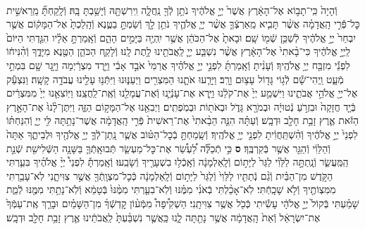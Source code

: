 \documentclass[twoside, openany, parskip=half, 11pt]{book}
\begin{document}
\begin{sometimes}
\begin{footnotesize}
\begin{multicols}{2}
\\
וְֿהָיָה֙ כִּֽי־תָב֣וֹא אֶל־הָאָ֔רֶץ אֲשֶׁר֙ יְיָ֣ אֱלֹהֶ֔יךָ נֹתֵ֥ן לְֿךָ֖ נַֽחֲלָ֑ה וִֽירִשְׁתָּ֖הּ וְֿיָשַׁ֥בְתָּ בָּֽהּ׃ וְֿלָֽקַחְתָּ֞ מֵֽרֵאשִׁ֣ית כׇּל־פְּֿֿרִ֣י הָֽאֲדָמָ֗ה אֲשֶׁ֨ר תָּבִ֧יא מֵֽאַרְצְֿךָ֛ אֲשֶׁ֨ר יְיָ֧ אֱלֹהֶ֛יךָ נֹתֵ֥ן לָ֖ךְ וְֿשַׂמְתָּ֣ בַטֶּ֑נֶא וְֿהָֽלַכְתָּ֙ אֶל־הַמָּק֔וֹם אֲשֶׁ֤ר יִבְחַר֙ יְיָ֣ אֱלֹהֶ֔יךָ לְֿשַׁכֵּ֥ן שְֿׁמ֖וֹ שָֽׁם׃ וּבָאתָ֙ אֶל־הַכֹּהֵ֔ן אֲשֶׁ֥ר יִֽהְיֶ֖ה בַּיָּמִ֣ים הָהֵ֑ם וְֿאָֽמַרְתָּ֣ אֵלָ֗יו הִגַּ֤דְתִּי הַיּוֹם֙ לַֽיְיָ֣ אֱלֹהֶ֔יךָ כִּי־בָ֨אתִי֙ אֶל־הָאָ֔רֶץ אֲשֶׁ֨ר נִשְׁבַּ֧ע יְיָ֛ לַֽאֲבֹתֵ֖ינוּ לָ֥תֶת לָֽנוּ׃
וְֿלָקַ֧ח הַכֹּהֵ֛ן הַטֶּ֖נֶא מִיָּדֶ֑ךָ וְֿהִ֨נִּיח֔וֹ לִפְנֵ֕י מִזְבַּ֖ח יְיָ֥ אֱלֹהֶֽיךָ׃ וְֿעָנִ֨יתָ וְֿאָֽמַרְתָּ֜ לִפְנֵ֣י יְיָ֣ אֱלֹהֶ֗יךָ אֲרַמִּי֙ אֹבֵ֣ד אָבִ֔י וַיֵּ֣רֶד מִצְרַ֔יְמָה וַיָּ֥גָר שָׁ֖ם בִּמְתֵ֣י מְֿעָ֑ט וַֽיְהִי־שָׁ֕ם לְֿג֥וֹי גָּד֖וֹל עָצ֥וּם וָרָֽב׃ וַיָּרֵ֧עוּ אֹתָ֛נוּ הַמִּצְרִ֖ים וַיְעַנּ֑וּנוּ וַיִּתְּֿנ֥וּ עָלֵ֖ינוּ עֲבֹדָ֥ה קָשָֽׁה׃ וַנִּצְעַ֕ק אֶל־יְיָ֖ אֱלֹהֵ֣י אֲבֹתֵ֑ינוּ וַיִּשְׁמַ֤ע יְיָ֙ אֶת־קֹלֵ֔נוּ וַיַּ֧רְא אֶת־עָנְֿיֵ֛נוּ וְֿאֶת־עֲמָלֵ֖נוּ וְֿאֶֽת־לַֽחֲצֵֽנוּ׃ וַיּֽוֹצִאֵ֤נוּ יְיָ֙ מִמִּצְרַ֔יִם בְּֿיָ֤ד חֲזָקָה֙ וּבִזְרֹ֣עַ נְֿטוּיָ֔ה וּבְמֹרָ֖א גָּדֹ֑ל וּבְאֹת֖וֹת וּבְמֹֽפְתִֽים׃ וַיְבִאֵ֖נוּ אֶל־הַמָּק֣וֹם הַזֶּ֑ה וַיִּתֶּן־לָ֨נוּ֙ אֶת־הָאָ֣רֶץ הַזֹּ֔את אֶ֛רֶץ זָבַ֥ת חָלָ֖ב וּדְבָֽשׁ׃ וְֿעַתָּ֗ה הִנֵּ֤ה הֵבֵ֨אתִי֙ אֶת־רֵאשִׁית֙ פְּֿרִ֣י הָֽאֲדָמָ֔ה אֲשֶׁר־נָתַ֥תָּה לִּ֖י יְיָ֑ וְֿהִנַּחְתּ֗וֹ לִפְנֵי֙ יְיָ֣ אֱלֹהֶ֔יךָ וְֿהִ֨שְׁתַּֽחֲוִ֔יתָ לִפְנֵ֖י יְיָ֥ אֱלֹהֶֽיךָ׃ וְֿשָֽׂמַחְתָּ֣ בְֿכׇל־הַטּ֗וֹב אֲשֶׁ֧ר נָֽתַן־לְֿךָ֛ יְיָ֥ אֱלֹהֶ֖יךָ וּלְבֵיתֶ֑ךָ אַתָּה֙ וְֿהַלֵּוִ֔י וְֿהַגֵּ֖ר אֲשֶׁ֥ר בְּֿקִרְבֶּֽךָ׃ \textbf{ס}
כִּ֣י תְֿכַלֶּ֞ה לַ֠עְשֵׂ֠ר אֶת־כׇּל־מַעְשַׂ֧ר תְּֿבוּאָֽתְֿךָ֛ בַּשָּׁנָ֥ה הַשְּֿׁלִישִׁ֖ת שְֿׁנַ֣ת הַֽמַּֽעֲשֵׂ֑ר וְֿנָֽתַתָּ֣ה לַלֵּוִ֗י לַגֵּר֙ לַיָּת֣וֹם וְֿלָֽאַלְמָנָ֔ה וְֿאָֽכְֿל֥וּ בִשְׁעָרֶ֖יךָ וְֿשָׂבֵֽעוּ׃ וְֿאָֽמַרְתָּ֡ לִפְנֵי֩ יְיָ֨ אֱלֹהֶ֜יךָ בִּעַ֧רְתִּי הַקֹּ֣דֶשׁ מִן־הַבַּ֗יִת וְֿגַ֨ם נְֿתַתִּ֤יו לַלֵּוִי֙ וְֿלַגֵּר֙ לַיָּת֣וֹם וְֿלָֽאַלְמָנָ֔ה כְּֿכׇל־מִצְוָֽתְֿךָ֖ אֲשֶׁ֣ר צִוִּיתָ֑נִי לֹֽא־עָבַ֥רְתִּי מִמִּצְוֹתֶ֖יךָ וְֿלֹ֥א שָׁכָֽחְֿתִּי׃ לֹֽא־אָכַ֨לְתִּי בְֿאֹנִ֜י מִמֶּ֗נּוּ וְֿלֹֽא־בִעַ֤רְתִּי מִמֶּ֨נּוּ֙ בְּֿטָמֵ֔א וְֿלֹֽא־נָתַ֥תִּי מִמֶּ֖נּוּ לְֿמֵ֑ת שָׁמַ֗עְתִּי בְּֿקוֹל֙ יְיָ֣ אֱלֹהָ֔י עָשִׂ֕יתִי כְּֿכֹ֖ל אֲשֶׁ֥ר צִוִּיתָֽנִי׃ הַשְׁקִ֩יפָה֩ מִמְּֿע֨וֹן קׇדְשְֿׁךָ֜ מִן־הַשָּׁמַ֗יִם וּבָרֵ֤ךְ אֶֽת־עַמְּֿךָ֙ אֶת־יִשְׂרָאֵ֔ל וְֿאֵת֙ הָֽאֲדָמָ֔ה אֲשֶׁ֥ר נָתַ֖תָּה לָ֑נוּ כַּֽאֲשֶׁ֤ר נִשְׁבַּ֨עְתָּ֙ לַֽאֲבֹתֵ֔ינוּ אֶ֛רֶץ זָבַ֥ת חָלָ֖ב וּדְבָֽשׁ׃


\end{multicols}
\end{footnotesize}
\end{sometimes}
\end{document}
